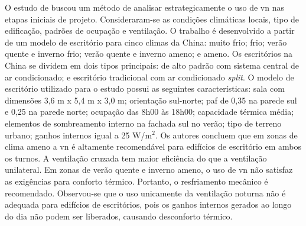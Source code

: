O estudo de  buscou um método de analisar estrategicamente o uso de \acrshort{vn} nas etapas iniciais de projeto. Consideraram-se as condições climáticas locais, tipo de edificação, padrões de ocupação e ventilação. O trabalho é desenvolvido a partir de um modelo de escritório para cinco climas da China: muito frio; frio; verão quente e inverno frio; verão quente e inverno ameno; e ameno. Os escritórios na China se dividem em dois tipos principais: de alto padrão com sistema central de ar condicionado; e escritório tradicional com ar condicionado \textit{split}. O modelo de escritório utilizado para o estudo possui as seguintes características: sala com dimensões 3,6 m x 5,4 m x 3,0 m; orientação sul-norte; \acrshort{paf} de 0,35 na parede sul e 0,25 na parede norte; ocupação das 8h00 às 18h00; capacidade térmica média; elementos de sombreamento interno na fachada sul no verão; tipo de terreno urbano; ganhos internos igual a 25 W/m$^2$. Os autores concluem que em zonas de clima ameno a \acrshort{vn} é altamente recomendável para edifícios de escritório em ambos os turnos. A ventilação cruzada tem maior eficiência do que a ventilação unilateral.
Em zonas de verão quente e inverno ameno, o uso de \acrshort{vn} não satisfaz as exigências para conforto térmico. Portanto, o resfriamento mecânico é recomendado. Observou-se que o uso unicamente da ventilação noturna não é adequada para edifícios de escritórios, pois os ganhos internos gerados ao longo do dia não podem ser liberados, causando desconforto térmico. 

